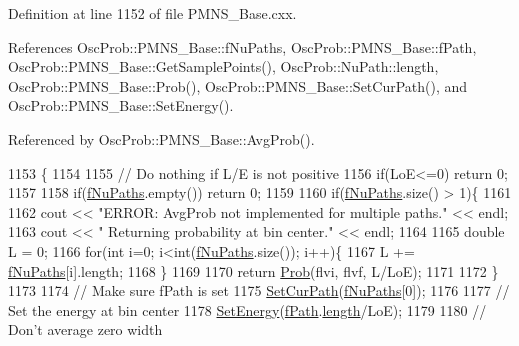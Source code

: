 Definition at line 1152 of file P\+M\+N\+S\+\_\+\+Base.\+cxx.



References Osc\+Prob\+::\+P\+M\+N\+S\+\_\+\+Base\+::f\+Nu\+Paths, Osc\+Prob\+::\+P\+M\+N\+S\+\_\+\+Base\+::f\+Path, Osc\+Prob\+::\+P\+M\+N\+S\+\_\+\+Base\+::\+Get\+Sample\+Points(), Osc\+Prob\+::\+Nu\+Path\+::length, Osc\+Prob\+::\+P\+M\+N\+S\+\_\+\+Base\+::\+Prob(), Osc\+Prob\+::\+P\+M\+N\+S\+\_\+\+Base\+::\+Set\+Cur\+Path(), and Osc\+Prob\+::\+P\+M\+N\+S\+\_\+\+Base\+::\+Set\+Energy().



Referenced by Osc\+Prob\+::\+P\+M\+N\+S\+\_\+\+Base\+::\+Avg\+Prob().


\begin{DoxyCode}
1153 \{
1154 
1155   \textcolor{comment}{// Do nothing if L/E is not positive}
1156   \textcolor{keywordflow}{if}(LoE<=0) \textcolor{keywordflow}{return} 0;
1157 
1158   \textcolor{keywordflow}{if}(\hyperlink{classOscProb_1_1PMNS__Base_a69db9d57e12fc7cbe0431bc6c18fac93}{fNuPaths}.empty()) \textcolor{keywordflow}{return} 0;
1159 
1160   \textcolor{keywordflow}{if}(\hyperlink{classOscProb_1_1PMNS__Base_a69db9d57e12fc7cbe0431bc6c18fac93}{fNuPaths}.size() > 1)\{
1161 
1162     cout << \textcolor{stringliteral}{"ERROR: AvgProb not implemented for multiple paths."} << endl;
1163     cout << \textcolor{stringliteral}{"       Returning probability at bin center."} << endl;
1164 
1165     \textcolor{keywordtype}{double} L = 0;
1166     \textcolor{keywordflow}{for}(\textcolor{keywordtype}{int} i=0; i<int(\hyperlink{classOscProb_1_1PMNS__Base_a69db9d57e12fc7cbe0431bc6c18fac93}{fNuPaths}.size()); i++)\{
1167       L += \hyperlink{classOscProb_1_1PMNS__Base_a69db9d57e12fc7cbe0431bc6c18fac93}{fNuPaths}[i].length;
1168     \}
1169 
1170     \textcolor{keywordflow}{return} \hyperlink{classOscProb_1_1PMNS__Base_aec5c399b93261f1962a4b7dbbb44b973}{Prob}(flvi, flvf, L/LoE);
1171 
1172   \}
1173 
1174   \textcolor{comment}{// Make sure fPath is set}
1175   \hyperlink{classOscProb_1_1PMNS__Base_a986e6ebef09a7e2eb7fee16a4c2c834d}{SetCurPath}(\hyperlink{classOscProb_1_1PMNS__Base_a69db9d57e12fc7cbe0431bc6c18fac93}{fNuPaths}[0]);
1176 
1177   \textcolor{comment}{// Set the energy at bin center}
1178   \hyperlink{classOscProb_1_1PMNS__Base_a95b3b0d0cab5e6a54b5ef99587f837c0}{SetEnergy}(\hyperlink{classOscProb_1_1PMNS__Base_a849437aa8891fe042e86886ce8f81c6e}{fPath}.\hyperlink{structOscProb_1_1NuPath_af22660894b6e25cf835500381b155557}{length}/LoE);
1179 
1180   \textcolor{comment}{// Don't average zero width}

\end{DoxyCode}
